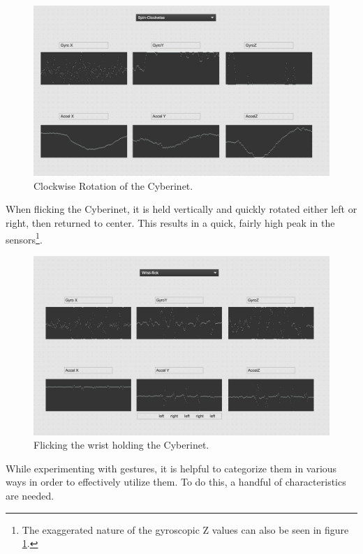\begin{figure}
    \centering
    \includegraphics[scale=0.2]{diagrams/gestureData/spin Clockwise.png}
    \caption{Clockwise Rotation of the Cyberinet.}
    \label{fig:clotRotate}
\end{figure}

When flicking the Cyberinet, it is held vertically and quickly rotated either left or right, then returned to center. This results in a quick, fairly high peak in the sensors\footnote{The exaggerated nature of the gyroscopic Z values can also be seen in figure \ref{fig:clotRotate}.}.

\begin{figure}
    \centering
    \includegraphics[scale=0.2]{diagrams/gestureData/wristFlick.png}
    \caption{Flicking the wrist holding the Cyberinet.}
    \label{fig:cflick}
\end{figure}


While experimenting with gestures, it is helpful to categorize them in various ways in order to effectively utilize them. To do this, a handful of characteristics are needed.

